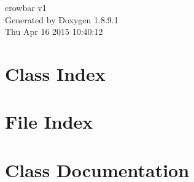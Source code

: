 \documentclass[twoside]{book}
\newcommand{\+}{\discretionary{\mbox{\scriptsize$\hookleftarrow$}}{}{}}
\newcommand{\clearemptydoublepage}{%
  \newpage{\pagestyle{empty}\cleardoublepage}%
}
\begin{document}
\hypersetup{pageanchor=false,
             bookmarks=true,
             bookmarksnumbered=true,
             pdfencoding=unicode
            }
\begin{titlepage}
\vspace*{7cm}
\begin{center}%
{\Large crowbar v1 }\\
\vspace*{1cm}
{\large Generated by Doxygen 1.8.9.1}\\
\vspace*{0.5cm}
{\small Thu Apr 16 2015 10:40:12}\\
\end{center}
\end{titlepage}
\clearemptydoublepage
\tableofcontents
\clearemptydoublepage
{}
\hypersetup{pageanchor=true}

\chapter{Class Index}

\chapter{File Index}

\chapter{Class Documentation}










































\end{document}
